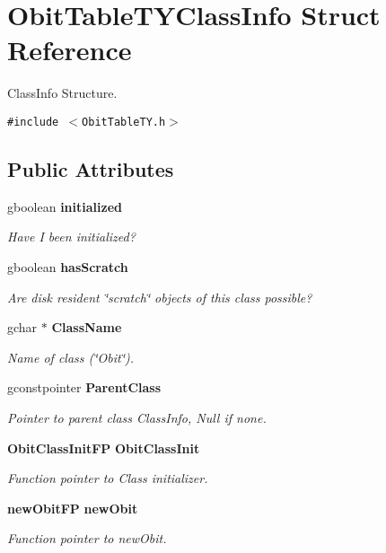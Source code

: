 \section{Obit\-Table\-TYClass\-Info Struct Reference}
\label{structObitTableTYClassInfo}
Class\-Info Structure.  


{\tt \#include $<$Obit\-Table\-TY.h$>$}

\subsection*{Public Attributes}
\begin{CompactItemize}
\item 
gboolean {\bf initialized}
\begin{CompactList}\small\item\em Have I been initialized? \item\end{CompactList}\item 
gboolean {\bf has\-Scratch}
\begin{CompactList}\small\item\em Are disk resident \char`\"{}scratch\char`\"{} objects of this class possible? \item\end{CompactList}\item 
gchar $\ast$ {\bf Class\-Name}
\begin{CompactList}\small\item\em Name of class (\char`\"{}Obit\char`\"{}). \item\end{CompactList}\item 
gconstpointer {\bf Parent\-Class}
\begin{CompactList}\small\item\em Pointer to parent class Class\-Info, Null if none. \item\end{CompactList}\item 
{\bf Obit\-Class\-Init\-FP} {\bf Obit\-Class\-Init}
\begin{CompactList}\small\item\em Function pointer to Class initializer. \item\end{CompactList}\item 
{\bf new\-Obit\-FP} {\bf new\-Obit}
\begin{CompactList}\small\item\em Function pointer to new\-Obit. \item\end{CompactList}\item 

\end{CompactItemize}
